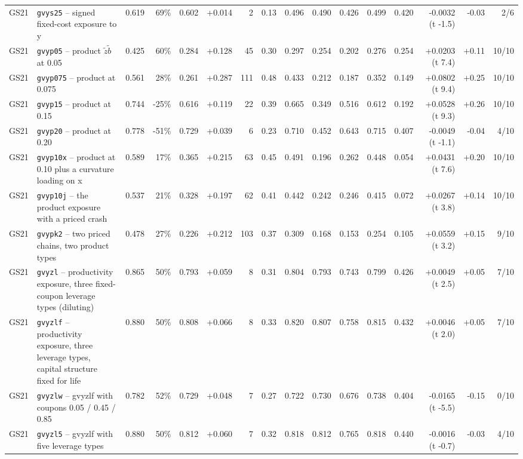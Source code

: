 \begin{landscape}
\begin{longtable}{lp{4.6cm}rrrrrrrrrrrrrr}
GS21 & \texttt{gvys25} -- signed fixed-cost exposure to y & 0.619 & 69\% & 0.602 & +0.014 & 2 & 0.13 & 0.496 & 0.490 & 0.426 & 0.499 & 0.420 & -0.0032 (t -1.5) & -0.03 & 2/6 \\
GS21 & \texttt{gvyp05} -- product $\tilde z\tilde b$ at 0.05 & 0.425 & 60\% & 0.284 & +0.128 & 45 & 0.30 & 0.297 & 0.254 & 0.202 & 0.276 & 0.254 & +0.0203 (t 7.4) & +0.11 & 10/10 \\
GS21 & \texttt{gvyp075} -- product at 0.075 & 0.561 & 28\% & 0.261 & +0.287 & 111 & 0.48 & 0.433 & 0.212 & 0.187 & 0.352 & 0.149 & +0.0802 (t 9.4) & +0.25 & 10/10 \\
GS21 & \texttt{gvyp15} -- product at 0.15 & 0.744 & -25\% & 0.616 & +0.119 & 22 & 0.39 & 0.665 & 0.349 & 0.516 & 0.612 & 0.192 & +0.0528 (t 9.3) & +0.26 & 10/10 \\
GS21 & \texttt{gvyp20} -- product at 0.20 & 0.778 & -51\% & 0.729 & +0.039 & 6 & 0.23 & 0.710 & 0.452 & 0.643 & 0.715 & 0.407 & -0.0049 (t -1.1) & -0.04 & 4/10 \\
GS21 & \texttt{gvyp10x} -- product at 0.10 plus a curvature loading on x & 0.589 & 17\% & 0.365 & +0.215 & 63 & 0.45 & 0.491 & 0.196 & 0.262 & 0.448 & 0.054 & +0.0431 (t 7.6) & +0.20 & 10/10 \\
GS21 & \texttt{gvyp10j} -- the product exposure with a priced crash & 0.537 & 21\% & 0.328 & +0.197 & 62 & 0.41 & 0.442 & 0.242 & 0.246 & 0.415 & 0.072 & +0.0267 (t 3.8) & +0.14 & 10/10 \\
GS21 & \texttt{gvypk2} -- two priced chains, two product types & 0.478 & 27\% & 0.226 & +0.212 & 103 & 0.37 & 0.309 & 0.168 & 0.153 & 0.254 & 0.105 & +0.0559 (t 3.2) & +0.15 & 9/10 \\
GS21 & \texttt{gvyzl} -- productivity exposure, three fixed-coupon leverage types (diluting) & 0.865 & 50\% & 0.793 & +0.059 & 8 & 0.31 & 0.804 & 0.793 & 0.743 & 0.799 & 0.426 & +0.0049 (t 2.5) & +0.05 & 7/10 \\
GS21 & \texttt{gvyzlf} -- productivity exposure, three leverage types, capital structure fixed for life & 0.880 & 50\% & 0.808 & +0.066 & 8 & 0.33 & 0.820 & 0.807 & 0.758 & 0.815 & 0.432 & +0.0046 (t 2.0) & +0.05 & 7/10 \\
GS21 & \texttt{gvyzlw} -- gvyzlf with coupons 0.05 / 0.45 / 0.85 & 0.782 & 52\% & 0.729 & +0.048 & 7 & 0.27 & 0.722 & 0.730 & 0.676 & 0.738 & 0.404 & -0.0165 (t -5.5) & -0.15 & 0/10 \\
GS21 & \texttt{gvyzl5} -- gvyzlf with five leverage types & 0.880 & 50\% & 0.812 & +0.060 & 7 & 0.32 & 0.818 & 0.812 & 0.765 & 0.818 & 0.440 & -0.0016 (t -0.7) & -0.03 & 4/10 \\

\end{longtable}
\end{landscape}
